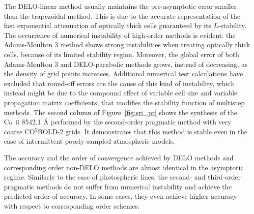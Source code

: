 \documentclass[iop,numberedappendix,twocolappendix,twocolumn]{emulateapj}
\begin{document}
The DELO-linear method usually maintains the pre-asymptotic error smaller than the trapezoidal method.
This is due to the accurate representation of the fast exponential attenuation of optically thick cells guaranteed by its $L$-stability. 
The occurrence of numerical instability of high-order methods is evident:
the Adams-Moulton 3 method shows strong instabilities when treating optically thick cells, because of its limited stability region.
Moreover, the global error of both Adams-Moulton 3 and DELO-parabolic methods grows, instead of decreasing,
as the density of grid points increases.
Additional numerical test calculations have excluded that round-off errors are the cause of this kind of instability, which instead
might be due to the compound effect of variable cell size and variable propagation matrix coefficients,
that modifies the stability function of multistep methods.
The second column of Figure~\ref{fig:sri_pr} shows
the synthesis of the Ca~{\sc ii} 8542.1 {\rm \AA} performed by the second-order pragmatic method with very coarse CO$^5$BOLD-2 grids.
It demonstrates that this method is stable even in the case of intermittent poorly-sampled atmospheric models.

The accuracy and the order of convergence achieved by DELO methods
and corresponding order non-DELO methods are almost identical in the asymptotic regime.
Similarly to the case of photospheric lines, the second- and third-order pragmatic methods do not suffer from numerical instability and achieve the predicted order of accuracy.
In some cases, they even achieve higher accuracy with respect to corresponding order schemes.
\vspace*{0.3cm}
%
\end{document}

